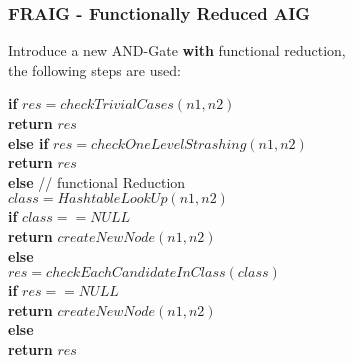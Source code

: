 \documentclass{beamer}
\begin{document}
\begin{frame}
\frametitle{FRAIG - Functionally Reduced AIG}

Introduce a new AND-Gate \textbf{with} functional reduction,\\
the following steps are used:\\

\bigskip

\textbf{if} $res=checkTrivialCases(n1, n2) $\\
\noindent\hspace*{6mm} \textbf{return} $res$ \\
\textbf{else if} $res=checkOneLevelStrashing(n1, n2) $\\
\noindent\hspace*{6mm} \textbf{return} $res$ \\
\textbf{else} // functional Reduction \\
\noindent\hspace*{6mm} $class = HashtableLookUp(n1,n2)$\\
\noindent\hspace*{6mm} \textbf{if} $class == NULL$\\
\noindent\hspace*{12mm} \textbf{return} $createNewNode(n1,n2)$\\
\noindent\hspace*{6mm} \textbf{else} \\
\noindent\hspace*{12mm} $res = checkEachCandidateInClass(class)$\\
\noindent\hspace*{12mm} \textbf{if} $res == NULL$ \\
\noindent\hspace*{18mm} \textbf{return} $createNewNode(n1,n2)$ \\
\noindent\hspace*{12mm} \textbf{else}  \\
\noindent\hspace*{18mm} \textbf{return} $res$ \\

\end{frame}
\end{document}
